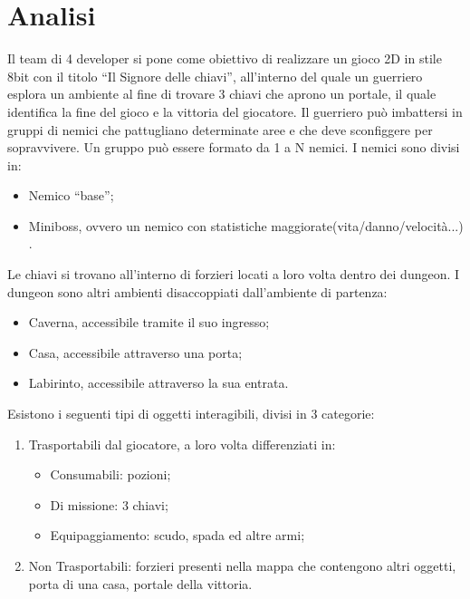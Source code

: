 \documentclass[a4paper, italian, 11pt, oneside]{report}
\begin{document}
\maketitle
\hypersetup{linkcolor=black}
\setcounter{tocdepth}{2}
\tableofcontents
\clearpage

\chapter{Analisi}


Il team di 4 developer si pone come obiettivo di realizzare un gioco 2D in stile 8bit con il titolo ``Il Signore delle chiavi'', all’interno del quale un guerriero esplora un ambiente al fine di trovare 3 chiavi che aprono un portale, il quale identifica la fine del gioco e la vittoria del giocatore. Il guerriero può imbattersi in gruppi di nemici che pattugliano determinate aree e che deve sconfiggere per sopravvivere. Un gruppo può essere formato da 1 a N nemici. 
I nemici sono divisi in: 
\begin{itemize}
  \item Nemico ``base'';
  \item Miniboss, ovvero un nemico con statistiche maggiorate(vita/danno/velocità...) .
\end{itemize}

Le chiavi si trovano all'interno di forzieri locati a loro volta dentro dei dungeon. I dungeon sono altri ambienti disaccoppiati dall'ambiente di partenza:
\begin{itemize}
  \item Caverna, accessibile tramite il suo ingresso;
  \item Casa, accessibile attraverso una porta;
  \item Labirinto, accessibile attraverso la sua entrata.
\end{itemize}

Esistono i seguenti tipi di oggetti interagibili, divisi in 3 categorie:
\begin{enumerate}
  \item Trasportabili dal giocatore, a loro volta differenziati in:
  \begin{itemize}
    \item Consumabili: pozioni; 
    \item Di missione: 3 chiavi;
    \item Equipaggiamento: scudo, spada ed altre armi;
  \end{itemize}
  \item Non Trasportabili: forzieri presenti nella mappa che contengono altri oggetti, porta di una casa, portale della vittoria.
\end{enumerate}
\end{document}
